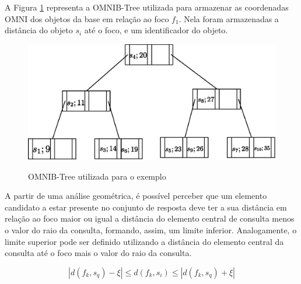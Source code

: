 A Figura \ref{fig:btree} representa a OMNIB-Tree utilizada para armazenar as coordenadas OMNI dos objetos da base em relação ao foco $f_1$. Nela foram armazenadas
a distância do objeto $s_i$ até o foco, e um identificador do objeto.

\begin{figure}[H]
\centering
\caption{OMNIB-Tree utilizada para o exemplo}
\includegraphics[width=.8\textwidth]{dados/figuras/btree.eps}
\label{fig:btree}
\end{figure}

A partir de uma análise geométrica, é possível perceber que um elemento candidato a estar presente no conjunto de resposta deve ter a sua distância em relação ao foco maior ou igual a distância do elemento central de consulta menos o valor do
raio da consulta, formando, assim, um limite inferior. Analogamente, o limite superior pode ser definido utilizando a distância do elemento central da consulta até o foco mais o valor do raio da consulta.

\begin{equation} \label{eq:omnirq}
|d(f_k, s_q) - \xi| \leq d(f_k, s_i) \leq |d(f_k, s_q) + \xi|
\end{equation}


